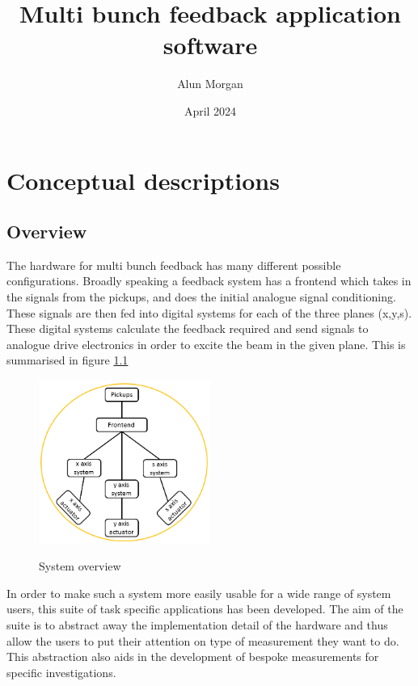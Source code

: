 \documentclass{report}
\newcommand{\docTitle}{Multi bunch feedback application software}
\begin{document}
\title{\docTitle}
\author{Alun Morgan}
\date{April 2024}

\maketitle

\tableofcontents
\clearpage
\chapter{Conceptual descriptions}
\section{Overview}
The hardware for multi bunch feedback has many different possible configurations. Broadly speaking a feedback system has a frontend which takes in the signals from the pickups, and does the initial analogue signal conditioning. These signals are then fed into digital systems for each of the three planes (x,y,s). These digital systems calculate the feedback required and send signals to analogue drive electronics in order to excite the beam in the given plane. This is summarised in figure \ref{system_overview}

\begin{figure}[hbt]
\begin{center}
  \includegraphics[width=0.5\textwidth]{top_level_system_overview.png}\\
  \caption{System overview}\label{system_overview}
\end{center}
\end{figure}

In order to make such a system more easily usable for a wide range of system users, this suite of task specific applications has been developed. The aim of the suite is to abstract away the implementation detail of the hardware and thus allow the users to put their attention on type of measurement they want to do. This abstraction also aids in the development of bespoke measurements for specific investigations.
\end{document}
